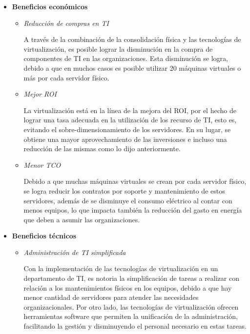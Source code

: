 \begin{itemize}
	\item \textbf{Beneficios económicos}\\
	\begin{itemize}
		
		\item \textit{Reducción de compras en TI}\vspace{3mm}
		
		A través de la combinación de la consolidación física y las tecnologías de virtualización, es posible lograr la disminución en la compra de componentes de TI en las organizaciones. Esta disminución se logra, debido a que en muchos casos es posible utilizar 20 máquinas virtuales o más por cada servidor físico. \\
		
		\item \textit{Mejor ROI}\vspace{3mm}
		
		La virtualización está en la línea de la mejora del ROI, por el hecho de lograr una tasa adecuada en la  utilización de los recurso de TI, esto es, evitando el sobre-dimensionamiento de los servidores. En su lugar, se obtiene una mayor aprovechamiento de las inversiones e incluso una reducción de las mismas como lo dijo anteriormente. \\
				
		\item \textit{Menor TCO}\vspace{3mm}
		
		Debido a que muchas máquinas virtuales se crean por cada servidor físico, se logra reducir los contratos por soporte y mantenimiento de estos servidores, además de se disminuye el consumo eléctrico al contar con menos equipos, lo que impacta también la reducción del gasto en energía que deben a asumir las organizaciones.\\
		
	\end{itemize}
	\item \textbf{Beneficios técnicos}\\
	\begin{itemize}
		\item \textit{Administración de TI simplificada}\vspace{3mm}
		
		Con la implementación de las tecnologías de virtualización en un departamento de TI, es notoria la simplificación de tareas a realizar con relación a los mantenimientos físicos en los equipos, debido a que hay menor cantidad de servidores para atender las necesidades organizacionales. Por otro lado, las tecnologías de virtualización ofrecen herramientas software que permiten la unificación de la administración, facilitando la gestión y disminuyendo el personal necesario en estas tareas.\\
		

\end{itemize}
\end{itemize}
